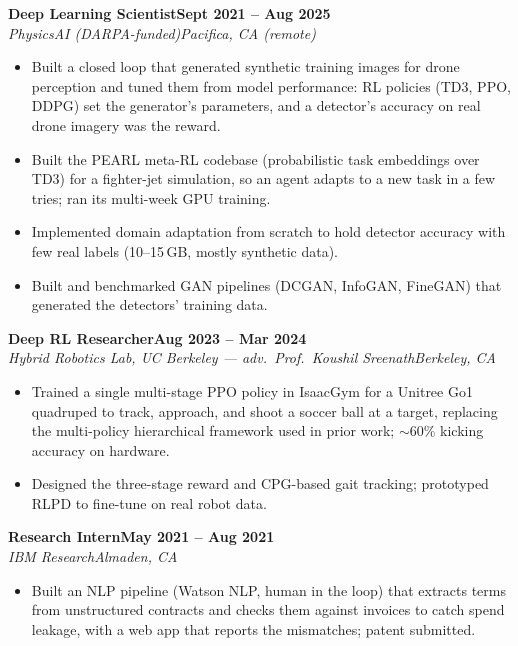 \documentclass[10pt]{article}
\newcommand{\role}[4]{\textbf{#1}\hfill\textbf{#2}\\\textit{#3}\hfill\textit{#4}}
\begin{document}
\role{Deep Learning Scientist}{Sept 2021 -- Aug 2025}{PhysicsAI (DARPA-funded)}{Pacifica, CA (remote)}
\begin{itemize}
\item Built a closed loop that generated synthetic training images for drone perception and tuned them from model performance: RL policies (TD3, PPO, DDPG) set the generator's parameters, and a detector's accuracy on real drone imagery was the reward.
\item Built the PEARL meta-RL codebase (probabilistic task embeddings over TD3) for a fighter-jet simulation, so an agent adapts to a new task in a few tries; ran its multi-week GPU training.
\item Implemented domain adaptation from scratch to hold detector accuracy with few real labels (10--15\,GB, mostly synthetic data).
\item Built and benchmarked GAN pipelines (DCGAN, InfoGAN, FineGAN) that generated the detectors' training data.
\end{itemize}

\role{Deep RL Researcher}{Aug 2023 -- Mar 2024}{Hybrid Robotics Lab, UC Berkeley --- adv.\ Prof.\ Koushil Sreenath}{Berkeley, CA}
\begin{itemize}
\item Trained a single multi-stage PPO policy in IsaacGym for a Unitree Go1 quadruped to track, approach, and shoot a soccer ball at a target, replacing the multi-policy hierarchical framework used in prior work; $\sim$60\% kicking accuracy on hardware.
\item Designed the three-stage reward and CPG-based gait tracking; prototyped RLPD to fine-tune on real robot data.
\end{itemize}

\role{Research Intern}{May 2021 -- Aug 2021}{IBM Research}{Almaden, CA}
\begin{itemize}
\item Built an NLP pipeline (Watson NLP, human in the loop) that extracts terms from unstructured contracts and checks them against invoices to catch spend leakage, with a web app that reports the mismatches; patent submitted.
\end{itemize}
\end{document}
